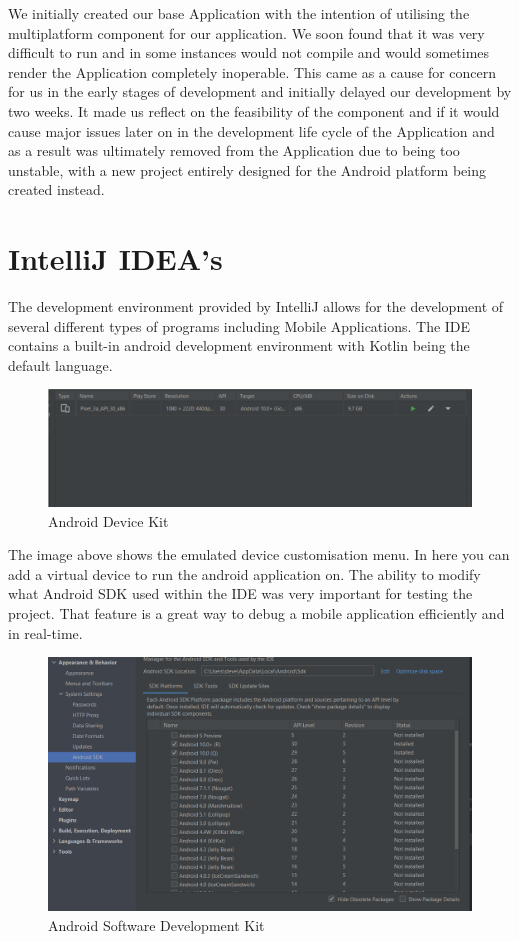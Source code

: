 \newline
We initially created our base Application with the intention of utilising the multiplatform component for our application. We soon found that it was very difficult to run and in some instances would not compile and would sometimes render the Application completely inoperable. This came as a cause for concern for us in the early stages of development and initially delayed our development by two weeks. It made us reflect on the feasibility of the component and if it would cause major issues later on in the development life cycle of the Application and as a result was ultimately removed from the Application due to being too unstable, with a new project entirely designed for the Android platform being created instead.

\section{IntelliJ IDEA's}
The development environment provided by IntelliJ allows for the \newline development of several different types of programs including Mobile \newline Applications. The IDE contains a built-in android development environment with Kotlin being the default language.
\newline
\begin{figure}[H]
    \centering
    \includegraphics[width=15cm]{img/androidADK.PNG}
    \caption{Android Device Kit}
    \label{fig:Android Device Kit}
\end{figure}
The image above shows the emulated device customisation menu. In here you can add a virtual device to run the android application on. The ability to modify what Android SDK used within the IDE was very important for testing the project. That feature is a great way to debug a mobile application efficiently and in real-time.
\begin{figure}[H]
    \centering
    \includegraphics[width=12cm]{img/androidSDK.PNG}
    \caption{Android Software Development Kit}
    \label{fig:sdk menu}
\end{figure}

